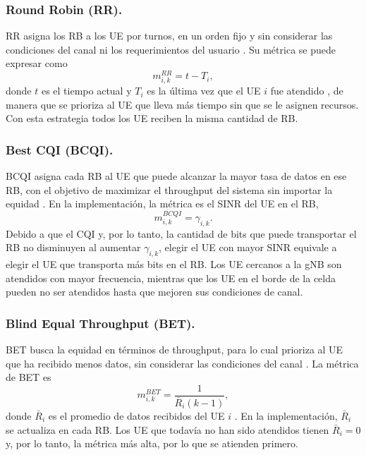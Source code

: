 \subsubsection{Round Robin (RR).}
RR asigna los RB a los UE por turnos, en un orden fijo y sin
considerar las condiciones del canal ni los requerimientos del
usuario \citep{capozzi2013,fitriasari2021}. Su métrica se puede expresar como
\begin{equation}
  m^{RR}_{i,k} = t - T_i,
  \label{eq:rr}
\end{equation}
donde $t$ es el tiempo actual y $T_i$ es la última vez que el UE $i$ fue
atendido \citep{capozzi2013}, de manera que se prioriza al UE que lleva
más tiempo sin que se le asignen recursos. Con esta estrategia todos los UE
reciben la misma cantidad de RB.

\subsubsection{Best CQI (BCQI).}
BCQI asigna cada RB al UE que puede alcanzar la mayor tasa de datos en ese RB,
con el objetivo de maximizar el throughput del sistema sin importar la equidad
\citep{capozzi2013,haque2023}. En la implementación, la métrica es el
SINR del UE en el RB,
\begin{equation}
  m^{BCQI}_{i,k} = \gamma_{i,k}.
  \label{eq:bcqi}
\end{equation}
Debido a que el CQI y, por lo tanto, la cantidad de bits que puede transportar
el RB no disminuyen al aumentar $\gamma_{i,k}$, elegir el UE con mayor SINR 
equivale a elegir el UE que transporta más bits en el RB. Los UE cercanos 
a la gNB son atendidos con mayor frecuencia, mientras que los UE 
en el borde de la celda pueden no ser atendidos hasta que mejoren sus 
condiciones de canal.

\subsubsection{Blind Equal Throughput (BET).}
BET busca la equidad en términos de throughput, para lo cual prioriza al
UE que ha recibido menos datos, sin considerar las condiciones del
canal \citep{capozzi2013}. La métrica de BET es
\begin{equation}
  m^{BET}_{i,k} = \frac{1}{\bar{R}_i(k-1)},
  \label{eq:bet}
\end{equation}
donde $\bar{R}_i$ es el promedio de datos recibidos del UE $i$
\citep{capozzi2013}. En la implementación, $\bar{R}_i$ se actualiza en cada
RB. Los UE que todavía no han sido atendidos tienen $\bar{R}_i = 0$ y,
por lo tanto, la métrica más alta, por lo que se atienden primero.

